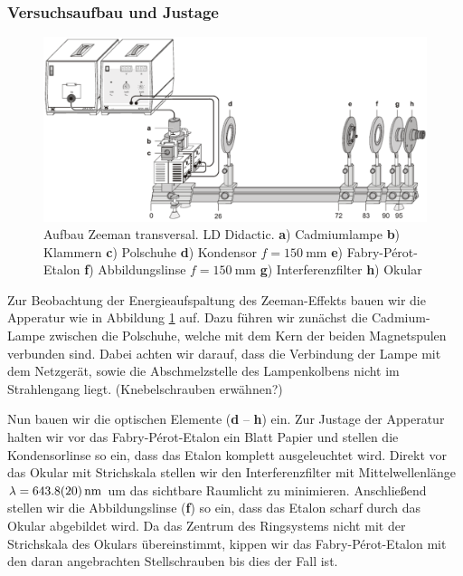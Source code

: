 \documentclass[11pt, a4paper]{article}
\begin{document}
\subsubsection{Versuchsaufbau und Justage}
\begin{figure}[h]
	\centering
	\includegraphics[width=1.0\textwidth]{./figures/aufbau_zeeman.pdf}
	\caption{Aufbau Zeeman transversal. LD Didactic. \textbf{a}) Cadmiumlampe \textbf{b}) Klammern \textbf{c}) Polschuhe \textbf{d}) Kondensor $f=\SI{150}{\milli\metre}$ \textbf{e}) Fabry-Pérot-Etalon \textbf{f}) Abbildungslinse $f=\SI{150}{\milli\metre}$ \textbf{g}) Interferenzfilter \textbf{h}) Okular }
	\label{fig:aufbau_zeeman}
\end{figure}

Zur Beobachtung der Energieaufspaltung des Zeeman-Effekts bauen wir die Apperatur wie in Abbildung \ref{fig:aufbau_zeeman} auf.
Dazu führen wir zunächst die Cadmium-Lampe zwischen die Polschuhe, welche mit dem Kern der beiden Magnetspulen verbunden sind.
Dabei achten wir darauf, dass die Verbindung der Lampe mit dem Netzgerät, sowie die Abschmelzstelle des Lampenkolbens nicht im Strahlengang liegt.
(Knebelschrauben erwähnen?)

Nun bauen wir die optischen Elemente (\textbf{d} -- \textbf{h}) ein.
Zur Justage der Apperatur halten wir vor das Fabry-Pérot-Etalon ein Blatt Papier und stellen die Kondensorlinse so ein, dass das Etalon komplett ausgeleuchtet wird.
Direkt vor das Okular mit Strichskala stellen wir den Interferenzfilter mit Mittelwellenlänge $\lambda = \SI{643,8 +- 2}{\nano\metre}$ um das sichtbare Raumlicht zu minimieren.
Anschließend stellen wir die Abbildungslinse (\textbf{f}) so ein, dass das Etalon scharf durch das Okular abgebildet wird.
Da das Zentrum des Ringsystems nicht mit der Strichskala des Okulars übereinstimmt, kippen wir das Fabry-Pérot-Etalon mit den daran angebrachten Stellschrauben bis dies der Fall ist.
\end{document}
